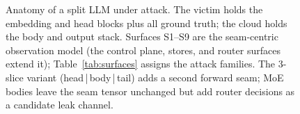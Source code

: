 \documentclass[11pt]{article}
\begin{document}
\begin{figure}[tp]
{}
\caption{Anatomy of a split LLM under attack. The victim holds the
embedding and head blocks plus all ground truth; the cloud holds the body
and output stack. Surfaces S1--S9 are the seam-centric observation model (the control plane,
stores, and router surfaces extend it);
Table~\ref{tab:surfaces} assigns the attack families. The 3-slice variant
(head\,|\,body\,|\,tail) adds a second forward seam; MoE bodies leave the
seam tensor unchanged but add router decisions as a candidate leak
channel.}
\label{fig:anatomy}
\end{figure}
\end{document}
